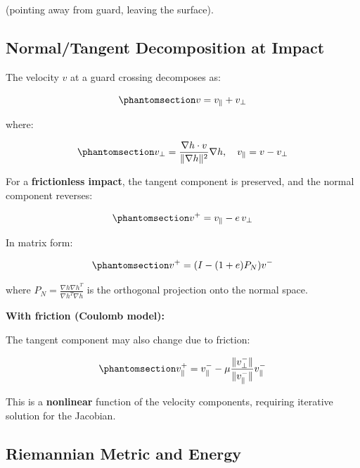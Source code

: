 \documentclass[
  letterpaper,
  DIV=11,
  numbers=noendperiod]{scrartcl}
\begin{document}
(pointing away from guard, leaving the surface).

\subsection{Normal/Tangent Decomposition at
Impact}\label{normaltangent-decomposition-at-impact}

The velocity \(v\) at a guard crossing decomposes as:

\begin{equation}\phantomsection\label{eq-velocity-decomp}{
v = v_\parallel + v_\perp
}\end{equation}

where:

\begin{equation}\phantomsection\label{eq-normal-tangent-components}{
v_\perp = \frac{\nabla h \cdot v}{\|\nabla h\|^2} \nabla h, \quad v_\parallel = v - v_\perp
}\end{equation}

For a \textbf{frictionless impact}, the tangent component is preserved,
and the normal component reverses:

\begin{equation}\phantomsection\label{eq-frictionless-impact}{
v^+ = v_\parallel - e \, v_\perp
}\end{equation}

In matrix form:

\begin{equation}\phantomsection\label{eq-impact-matrix}{
v^+ = (I - (1+e) P_N) v^-
}\end{equation}

where \(P_N = \frac{\nabla h \nabla h^T}{\nabla h^T \nabla h}\) is the
orthogonal projection onto the normal space.

\textbf{With friction (Coulomb model):}

The tangent component may also change due to friction:

\begin{equation}\phantomsection\label{eq-friction-impact}{
v^+_\parallel = v^-_\parallel - \mu \frac{\|v_\perp^-\|}{\|v_\parallel^-\|} v_\parallel^-
}\end{equation}

This is a \textbf{nonlinear} function of the velocity components,
requiring iterative solution for the Jacobian.

\subsection{Riemannian Metric and
Energy}\label{riemannian-metric-and-energy}
\end{document}
